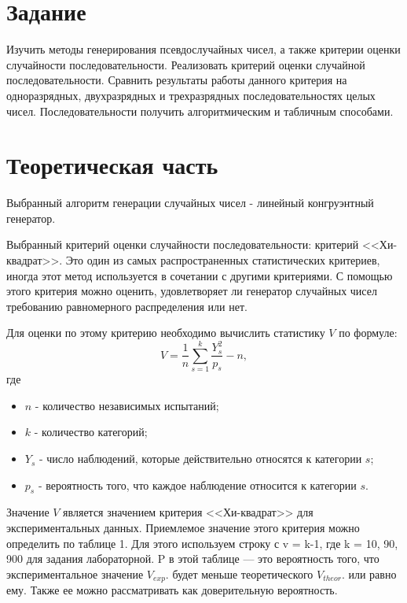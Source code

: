 
\section*{Задание}
Изучить методы генерирования псевдослучайных чисел, а также критерии оценки случайности последовательности. Реализовать критерий оценки случайной последовательности. Сравнить результаты работы данного критерия на одноразрядных, двухразрядных и трехразрядных последовательностях целых чисел. Последовательности получить алгоритмическим и табличным способами.


\section*{Теоретическая часть}
Выбранный алгоритм генерации случайных чисел - линейный конгруэнтный генератор.

Выбранный критерий оценки случайности последовательности: критерий <<Хи-квадрат>>. Это один из самых распространенных статистических критериев, иногда этот метод используется в сочетании с другими критериями. С помощью этого критерия можно оценить, удовлетворяет ли генератор случайных чисел
требованию равномерного распределения или нет.

Для оценки по этому критерию необходимо вычислить статистику $V$ по формуле:
$$
V = \frac{1}{n} \sum_{s=1}^{k} \frac{Y_{s}^{2}}{p_{s}} - n,
$$
где
\begin{itemize}
	\item $n$ - количество независимых испытаний;
	\item $k$ - количество категорий;
	\item $Y_s$ - число наблюдений, которые действительно относятся к категории $s$;
	\item $p_s$ - вероятность того, что каждое наблюдение относится к категории $s$.
\end{itemize}

Значение $V$ является значением критерия <<Хи-квадрат>> для экспериментальных данных. Приемлемое значение этого критерия можно определить по таблице 1. Для этого используем
строку с v = k-1, где k = 10, 90, 900 для задания лабораторной. P в этой таблице — это
вероятность того, что экспериментальное значение $V_{exp}$. будет меньше теоретического
$V_{theor}$. или равно ему. Также ее можно рассматривать как доверительную вероятность.


